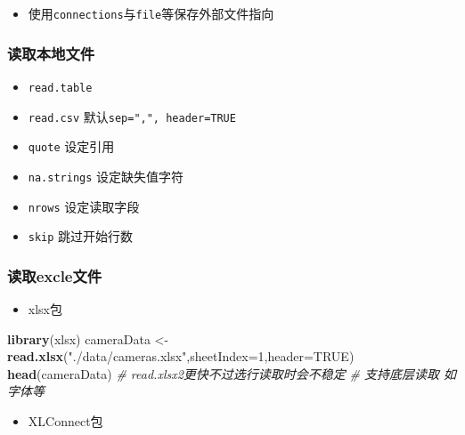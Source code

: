 \documentclass[]{book}
\newenvironment{Shaded}{\begin{snugshade}}{\end{snugshade}}
\newcommand{\CommentTok}[1]{\textcolor[rgb]{0.56,0.35,0.01}{\textit{#1}}}
\newcommand{\DataTypeTok}[1]{\textcolor[rgb]{0.13,0.29,0.53}{#1}}
\newcommand{\DecValTok}[1]{\textcolor[rgb]{0.00,0.00,0.81}{#1}}
\newcommand{\KeywordTok}[1]{\textcolor[rgb]{0.13,0.29,0.53}{\textbf{#1}}}
\newcommand{\NormalTok}[1]{#1}
\newcommand{\OtherTok}[1]{\textcolor[rgb]{0.56,0.35,0.01}{#1}}
\newcommand{\StringTok}[1]{\textcolor[rgb]{0.31,0.60,0.02}{#1}}
\providecommand{\tightlist}{%
  \setlength{\itemsep}{0pt}\setlength{\parskip}{0pt}}
\begin{document}
\begin{itemize}
\tightlist
\item
  使用\texttt{connections}与\texttt{file}等保存外部文件指向
\end{itemize}

\hypertarget{ux8bfbux53d6ux672cux5730ux6587ux4ef6}{%
\subsubsection{读取本地文件}\label{ux8bfbux53d6ux672cux5730ux6587ux4ef6}}

\begin{itemize}
\tightlist
\item
  \texttt{read.table}
\item
  \texttt{read.csv} 默认\texttt{sep=",",\ header=TRUE}
\item
  \texttt{quote} 设定引用
\item
  \texttt{na.strings} 设定缺失值字符
\item
  \texttt{nrows} 设定读取字段
\item
  \texttt{skip} 跳过开始行数
\end{itemize}

\hypertarget{ux8bfbux53d6excleux6587ux4ef6}{%
\subsubsection{读取excle文件}\label{ux8bfbux53d6excleux6587ux4ef6}}

\begin{itemize}
\tightlist
\item
  xlsx包
\end{itemize}

\begin{Shaded}
\begin{Highlighting}[]
\KeywordTok{library}\NormalTok{(xlsx)}
\NormalTok{cameraData <-}\StringTok{ }\KeywordTok{read.xlsx}\NormalTok{(}\StringTok{"./data/cameras.xlsx"}\NormalTok{,}\DataTypeTok{sheetIndex=}\DecValTok{1}\NormalTok{,}\DataTypeTok{header=}\OtherTok{TRUE}\NormalTok{)}
\KeywordTok{head}\NormalTok{(cameraData)}
\CommentTok{# read.xlsx2更快不过选行读取时会不稳定}
\CommentTok{# 支持底层读取 如字体等}
\end{Highlighting}
\end{Shaded}

\begin{itemize}
\tightlist
\item
  XLConnect包
\end{itemize}
\end{document}
